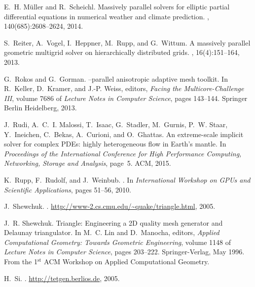 \documentclass[]{siamart0216}
\begin{document}
\begin{thebibliography}{10}
E.~H. M{\"u}ller and R.~Scheichl.
\newblock Massively parallel solvers for elliptic partial differential
  equations in numerical weather and climate prediction.
,
  140(685):2608--2624, 2014.

S.~Reiter, A.~Vogel, I.~Heppner, M.~Rupp, and G.~Wittum.
\newblock A massively parallel geometric multigrid solver on hierarchically
  distributed grids.
, 16(4):151--164, 2013.

G.~Rokos and G.~Gorman.
--parallel anisotropic adaptive mesh toolkit.
\newblock In R.~Keller, D.~Kramer, and J.-P. Weiss, editors, {\em Facing the
  Multicore-Challenge III}, volume 7686 of {\em Lecture Notes in Computer
  Science}, pages 143--144. Springer Berlin Heidelberg, 2013.

J.~Rudi, A.~C.~I. Malossi, T.~Isaac, G.~Stadler, M.~Gurnis, P.~W. Staar,
  Y.~Ineichen, C.~Bekas, A.~Curioni, and O.~Ghattas.
\newblock An extreme-scale implicit solver for complex {PDEs}: highly
  heterogeneous flow in {E}arth's mantle.
\newblock In {\em Proceedings of the International Conference for High
  Performance Computing, Networking, Storage and Analysis}, page~5. ACM, 2015.

K.~Rupp, F.~Rudolf, and J.~Weinbub.
.
\newblock In {\em International Workshop on GPUs and Scientific Applications},
  pages 51--56, 2010.

J.~{Shewchuk}.
.
\newblock \url{http://www-2.cs.cmu.edu/~quake/triangle.html}, 2005.

J.~R. Shewchuk.
\newblock Triangle: {E}ngineering a {2D} quality mesh generator and {D}elaunay
  triangulator.
\newblock In M.~C. Lin and D.~Manocha, editors, {\em Applied Computational
  Geometry: Towards Geometric Engineering}, volume 1148 of {\em Lecture Notes
  in Computer Science}, pages 203--222. Springer-Verlag, May 1996.
\newblock From the 1$^\text{st}$ ACM Workshop on Applied Computational
  Geometry.

H.~{Si}.
.
\newblock \url{http://tetgen.berlios.de}, 2005.


\end{thebibliography}
\end{document}
